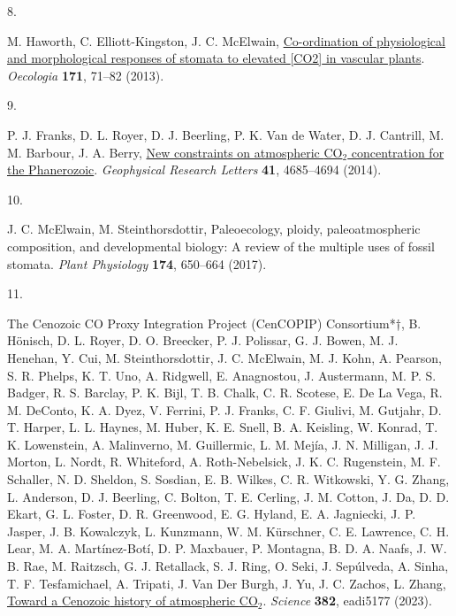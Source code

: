 \documentclass[
  letterpaper,
  DIV=11,
  numbers=noendperiod]{scrartcl}
\newlength{\cslhangindent}
\newlength{\csllabelwidth}
\newenvironment{CSLReferences}[2] %
 {\begin{list}{}{%
  \setlength{\itemindent}{0pt}
  \setlength{\leftmargin}{0pt}
  \setlength{\parsep}{0pt}
  \ifodd #1
   \setlength{\leftmargin}{\cslhangindent}
   \setlength{\itemindent}{-1\cslhangindent}
  \fi
  \setlength{\itemsep}{#2\baselineskip}}}
 {\end{list}}
\newcommand{\CSLLeftMargin}[1]{\parbox[t]{\csllabelwidth}{\strut#1\strut}}
\newcommand{\CSLRightInline}[1]{\parbox[t]{\linewidth - \csllabelwidth}{\strut#1\strut}}
\begin{document}
\begin{CSLReferences}{0}{1}
\CSLLeftMargin{8. }%
\CSLRightInline{M. Haworth, C. Elliott-Kingston, J. C. McElwain,
\href{https://doi.org/10.1007/s00442-012-2406-9}{Co-ordination of
physiological and morphological responses of stomata to elevated
{[}{CO2}{]} in vascular plants}. \emph{Oecologia} \textbf{171}, 71--82
(2013).}

\CSLLeftMargin{9. }%
\CSLRightInline{P. J. Franks, D. L. Royer, D. J. Beerling, P. K. Van de
Water, D. J. Cantrill, M. M. Barbour, J. A. Berry,
\href{https://doi.org/10.1002/2014GL060457}{New constraints on
atmospheric {CO}\(_{\textrm{2}}\) concentration for the {Phanerozoic}}.
\emph{Geophysical Research Letters} \textbf{41}, 4685--4694 (2014).}

\CSLLeftMargin{10. }%
\CSLRightInline{J. C. McElwain, M. Steinthorsdottir, Paleoecology,
ploidy, paleoatmospheric composition, and developmental biology: A
review of the multiple uses of fossil stomata. \emph{Plant Physiology}
\textbf{174}, 650--664 (2017).}

\CSLLeftMargin{11. }%
\CSLRightInline{The Cenozoic CO Proxy Integration Project (CenCOPIP)
Consortium*†, B. Hönisch, D. L. Royer, D. O. Breecker, P. J. Polissar,
G. J. Bowen, M. J. Henehan, Y. Cui, M. Steinthorsdottir, J. C. McElwain,
M. J. Kohn, A. Pearson, S. R. Phelps, K. T. Uno, A. Ridgwell, E.
Anagnostou, J. Austermann, M. P. S. Badger, R. S. Barclay, P. K. Bijl,
T. B. Chalk, C. R. Scotese, E. De La Vega, R. M. DeConto, K. A. Dyez, V.
Ferrini, P. J. Franks, C. F. Giulivi, M. Gutjahr, D. T. Harper, L. L.
Haynes, M. Huber, K. E. Snell, B. A. Keisling, W. Konrad, T. K.
Lowenstein, A. Malinverno, M. Guillermic, L. M. Mejía, J. N. Milligan,
J. J. Morton, L. Nordt, R. Whiteford, A. Roth-Nebelsick, J. K. C.
Rugenstein, M. F. Schaller, N. D. Sheldon, S. Sosdian, E. B. Wilkes, C.
R. Witkowski, Y. G. Zhang, L. Anderson, D. J. Beerling, C. Bolton, T. E.
Cerling, J. M. Cotton, J. Da, D. D. Ekart, G. L. Foster, D. R.
Greenwood, E. G. Hyland, E. A. Jagniecki, J. P. Jasper, J. B. Kowalczyk,
L. Kunzmann, W. M. Kürschner, C. E. Lawrence, C. H. Lear, M. A.
Martínez-Botí, D. P. Maxbauer, P. Montagna, B. D. A. Naafs, J. W. B.
Rae, M. Raitzsch, G. J. Retallack, S. J. Ring, O. Seki, J. Sepúlveda, A.
Sinha, T. F. Tesfamichael, A. Tripati, J. Van Der Burgh, J. Yu, J. C.
Zachos, L. Zhang, \href{https://doi.org/10.1126/science.adi5177}{Toward
a {Cenozoic} history of atmospheric {CO}\(_{\textrm{2}}\)}.
\emph{Science} \textbf{382}, eadi5177 (2023).}


\end{CSLReferences}
\end{document}
